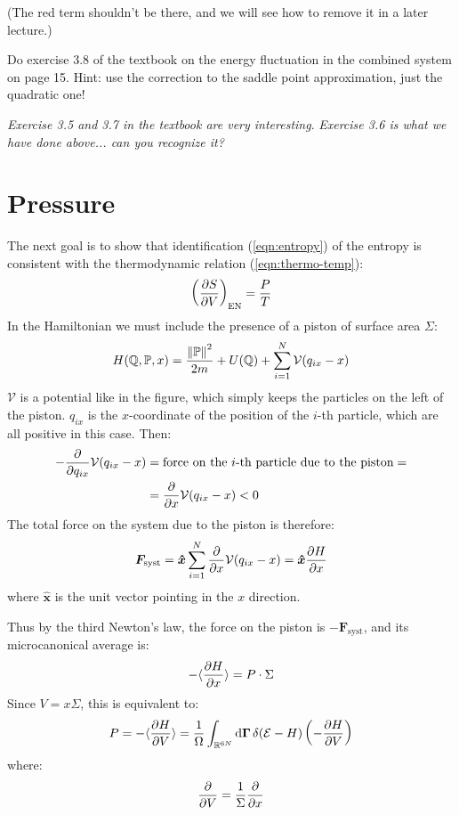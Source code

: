 \documentclass[../../main.tex]{subfiles}
\begin{document}
\medskip

(The red term shouldn't be there, and we will see how to remove it in a later lecture.)

\begin{exo}[6]
    Do exercise 3.8 of the textbook on the energy fluctuation in the combined system on page 15. Hint: use the correction to the saddle point approximation, just the quadratic one!
\end{exo}

\textit{Exercise 3.5 and 3.7 in the textbook are very interesting}. \textit{Exercise 3.6 is what we have done above... can you recognize it?}

\section{Pressure}
The next goal is to show that identification (\ref{eqn:entropy}) of the entropy is consistent with the thermodynamic relation (\ref{eqn:thermo-temp}):
\begin{align*}
    \left(\pdv{S}{V}\right)_{\mathrm{EN}} = \frac{P}{T} 
\end{align*}
In the Hamiltonian we must include the presence of a piston of surface area $\Sigma$:
\begin{align*}
    H(\mathbb{Q}, \mathbb{P}, x) = \frac{\norm{\mathbb{P}}^2}{2m} + U(\mathbb{Q}) + \sum_{i=1}^N \mathcal{V}(q_{ix} - x) 
\end{align*}%
$\mathcal{V}$ is a potential like in the figure, which simply keeps the particles on the left of the piston. $q_{ix}$ is the $x$-coordinate of the position of the $i$-th particle, which are all positive in this case. Then:
\begin{align*}
    -\pdv{q_{ix}} \mathcal{V}(q_{ix}-x) &= \text{force on the $i$-th particle due to the piston} = \\
    &=\pdv{x} \mathcal{V}(q_{ix} - x) < 0
\end{align*}
The total force on the system due to the piston is therefore:
\begin{align*}
    \bm{F}_{\mathrm{syst}} = \bm{\hat{x}} \sum_{i=1}^N \pdv{x} \mathcal{V}(q_{ix}-x) = \bm{\hat{x}} \pdv{H}{x}
\end{align*}
where $\bm{\hat{x}}$ is the unit vector pointing in the $x$ direction.

\medskip

Thus by the third Newton's law, the force on the piston is $-\bm{F}_{\mathrm{syst}}$, and its microcanonical average is:
\begin{align*}
    -\langle \pdv{H}{x} \rangle = P \cdot \Sigma
\end{align*}
Since $V = x \Sigma$, this is equivalent to:
\begin{align*}
    P = - \langle \pdv{H}{V} \rangle = \frac{1}{\Omega} \int_{\mathbb{R}^{6N}} \dd{\bm{\Gamma}} \delta(\mathcal{E}-H) \left(-\pdv{H}{V}\right)
\end{align*}
where:
\begin{align*}
    \pdv{V} = \frac{1}{\Sigma} \pdv{x} 
\end{align*}
\end{document}
